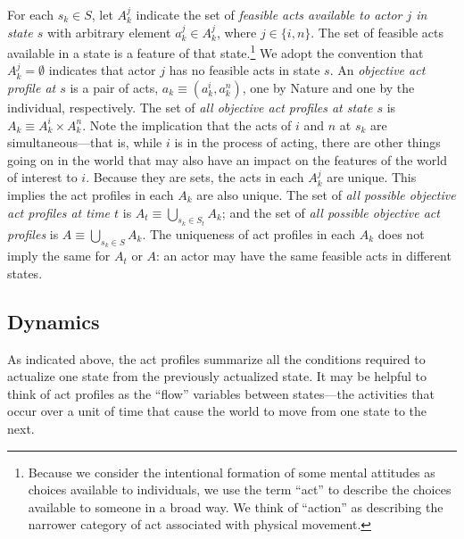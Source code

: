 \documentclass[
11pt,
titlepage,
reqno,
]{article}%
\theoremstyle{definition}
\begin{document}
For each  $s_k\in S$, let $A^j_k$ indicate the set of \textit{feasible acts available to actor $j$ in state $s$} with arbitrary element $a^j_k\in A^j_k$, where $j\in\{i,n\}$.
The set of feasible acts available in a state is a feature of that state.\footnote
{
	Because we consider the intentional formation of some mental attitudes as choices available to individuals, we use the term ``act'' to describe the choices available to someone in a broad way.
	We think of ``action'' as describing the narrower category of act associated with physical movement.
} 
We adopt the convention that $A^j_k=\emptyset$ indicates that actor $j$ has no feasible acts in state $s$.
An \textit{objective act profile at $s$}  is a pair of acts, $a_k\equiv(a^i_k,a^n_k)$, one by Nature and one by the individual, respectively. 
The set of \textit{all objective act profiles at state $s$} is $A_k\equiv A^i_k\times A^n_k$.
Note the implication that the acts of $i$ and $n$ at $s_k$ are simultaneous---that is, while $i$ is in the process of acting, there are other things going on in the world that may also have an impact on the features of the world of interest to $i$.
Because they are sets, the acts in each $A^j_k$ are unique.
This implies the act profiles in each $A_k$ are also unique.
The set of \textit{all possible objective act profiles at time $t$} is  $A_t\equiv \bigcup_{s_k\in S_t} A_k$; and the set of \textit{all possible objective act profiles} is $A\equiv \bigcup_{s_k\in S} A_k$.
The uniqueness of act profiles in each $A_k$ does not imply the same for $A_t$ or $A$: an actor may have the same feasible acts in different states.

 
	
\subsection{Dynamics} 
	
As indicated above, the act profiles summarize all the conditions required to actualize one state from the previously actualized state. 	It may be helpful to think of act profiles as the ``flow'' variables between states---the activities that occur over a unit of time that cause the world to move from one state to the next.
	
\end{document}

